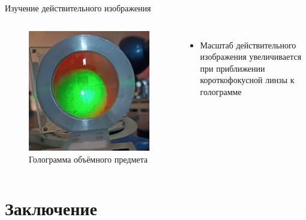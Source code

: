 \documentclass[11pt]{beamer} %
\begin{document}
    \begin{frame}{Изучение действительного изображения}
    \small
        \begin{columns}
        \begin{figure}[H]
            \centering
            \includegraphics[width = \textwidth]{images/imaginary_image_lens.jpg}
            \caption{Голограмма объёмного предмета}
        \end{figure}
        
        \begin{itemize}
            \item Масштаб действительного изображения увеличивается при приближении короткофокусной линзы к голограмме
        \end{itemize}
        \end{columns}
    \end{frame}
    
    \section{Заключение}
    
\end{document}
